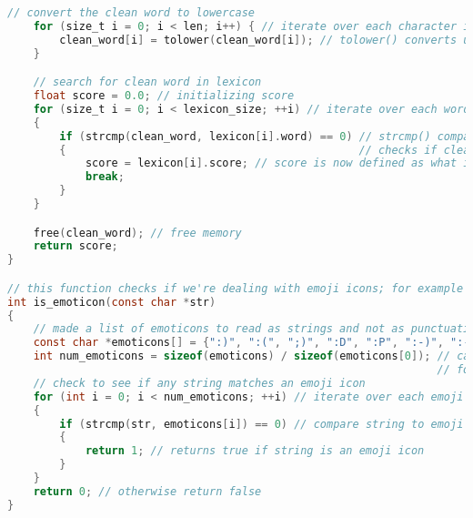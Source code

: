 \documentclass{report}
\begin{document}
\begin{lstlisting}[language=C]
    // convert the clean word to lowercase
    for (size_t i = 0; i < len; i++) { // iterate over each character in the string
        clean_word[i] = tolower(clean_word[i]); // tolower() converts uppercase letters to lowercase
    }

    // search for clean word in lexicon
    float score = 0.0; // initializing score
    for (size_t i = 0; i < lexicon_size; ++i) // iterate over each word in the lexicon
    { 
        if (strcmp(clean_word, lexicon[i].word) == 0) // strcmp() compares 2 strings to each other ie. it
        {                                             // checks if clean word matches anything in the lexicon
            score = lexicon[i].score; // score is now defined as what it is in the lexicon
            break; 
        }
    }

    free(clean_word); // free memory
    return score;
}

// this function checks if we're dealing with emoji icons; for example ":D" (as to not confuse with punctuation)
int is_emoticon(const char *str) 
{ 
    // made a list of emoticons to read as strings and not as punctuation
    const char *emoticons[] = {":)", ":(", ";)", ":D", ":P", ":-)", ":-(", ";-)", ":-D", ":-P"}; 
    int num_emoticons = sizeof(emoticons) / sizeof(emoticons[0]); // calculates number of emoji icons in array; good
                                                                  // for if I'd like to add more emojis to the array
    // check to see if any string matches an emoji icon
    for (int i = 0; i < num_emoticons; ++i) // iterate over each emoji icon 
    { 
        if (strcmp(str, emoticons[i]) == 0) // compare string to emoji icons to check if they match any emoji icon
        { 
            return 1; // returns true if string is an emoji icon
        }
    }
    return 0; // otherwise return false
}


\end{lstlisting}
\end{document}
